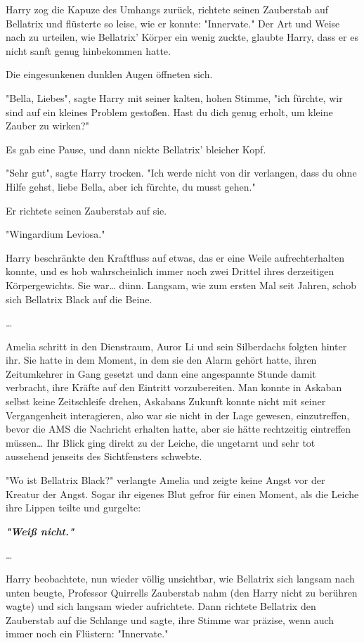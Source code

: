 {Harry zog die Kapuze des Umhangs zurück, richtete seinen Zauberstab auf Bellatrix und flüsterte so leise, wie er konnte: "Innervate." Der Art und Weise nach zu urteilen, wie Bellatrix' Körper ein wenig zuckte, glaubte Harry, dass er es nicht sanft genug hinbekommen hatte.

Die eingesunkenen dunklen Augen öffneten sich.

"Bella, Liebes", sagte Harry mit seiner kalten, hohen Stimme, "ich fürchte, wir sind auf ein kleines Problem gestoßen. Hast du dich genug erholt, um kleine Zauber zu wirken?"

Es gab eine Pause, und dann nickte Bellatrix' bleicher Kopf.

"Sehr gut", sagte Harry trocken. "Ich werde nicht von dir verlangen, dass du ohne Hilfe gehst, liebe Bella, aber ich fürchte, du musst gehen."

Er richtete seinen Zauberstab auf sie.

"Wingardium Leviosa."

Harry beschränkte den Kraftfluss auf etwas, das er eine Weile aufrechterhalten konnte, und es hob wahrscheinlich immer noch zwei Drittel ihres derzeitigen Körpergewichts. Sie war… dünn. Langsam, wie zum ersten Mal seit Jahren, schob sich Bellatrix Black auf die Beine.

…

Amelia schritt in den Dienstraum, Auror Li und sein Silberdachs folgten hinter ihr. Sie hatte in dem Moment, in dem sie den Alarm gehört hatte, ihren Zeitumkehrer in Gang gesetzt und dann eine angespannte Stunde damit verbracht, ihre Kräfte auf den Eintritt vorzubereiten. Man konnte in Askaban selbst keine Zeitschleife drehen, Askabans Zukunft konnte nicht mit seiner Vergangenheit interagieren, also war sie nicht in der Lage gewesen, einzutreffen, bevor die AMS die Nachricht erhalten hatte, aber sie hätte rechtzeitig eintreffen müssen… Ihr Blick ging direkt zu der Leiche, die ungetarnt und sehr tot aussehend jenseits des Sichtfensters schwebte.

"Wo ist Bellatrix Black?" verlangte Amelia und zeigte keine Angst vor der Kreatur der Angst. Sogar ihr eigenes Blut gefror für einen Moment, als die Leiche ihre Lippen teilte und gurgelte:

\textbf{\emph{"Weiß nicht."}}

…

Harry beobachtete, nun wieder völlig unsichtbar, wie Bellatrix sich langsam nach unten beugte, Professor Quirrells Zauberstab nahm (den Harry nicht zu berühren wagte) und sich langsam wieder aufrichtete. Dann richtete Bellatrix den Zauberstab auf die Schlange und sagte, ihre Stimme war präzise, wenn auch immer noch ein Flüstern: "Innervate."

}
